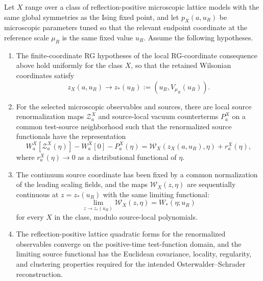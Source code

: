 \begin{hypothesis}
\label{hyp:conditional-lattice-to-continuum-universality-data}
Let \(X\) range over a class of reflection-positive microscopic lattice
models with the same global symmetries as the Ising fixed point, and let
\(p_X(a,u_R)\) be microscopic parameters tuned so that the relevant endpoint
coordinate at the reference scale \(\mu_R\) is the same fixed value \(u_R\).
Assume the following hypotheses.
\begin{enumerate}[label=(\roman*)]
  \item The finite-coordinate RG hypotheses of
  the local RG-coordinate consequence above hold uniformly for
  the class \(X\), so that the retained Wilsonian coordinates satisfy
  \[
    z_X(a,u_R)\longrightarrow z_\ast(u_R):=(u_R,V_{\mu_R}(u_R)).
  \]
  \item For the selected microscopic observables and sources, there are local
  source renormalization maps \(\mathcal Z^X_a\) and source-local vacuum
  counterterms \(P^X_a\) on a common test-source neighborhood such that the
  renormalized source functionals have the representation
  \[
    W^X_a[\mathcal Z^X_a(\eta)]-W^X_a[0]-P^X_a(\eta)
    =
    \mathcal W_X(z_X(a,u_R),\eta)+r^X_a(\eta),
  \]
  where \(r^X_a(\eta)\to0\) as a distributional functional of \(\eta\).
  \item The continuum source coordinate has been fixed by a common
  normalization of the leading scaling fields, and the maps
  \(\mathcal W_X(z,\eta)\) are sequentially continuous at
  \(z=z_\ast(u_R)\) with the same limiting functional:
  \[
    \lim_{z\to z_\ast(u_R)}\mathcal W_X(z,\eta)=W_\ast(\eta;u_R)
  \]
  for every \(X\) in the class, modulo source-local polynomials.
  \item The reflection-positive lattice quadratic forms for the renormalized
  observables converge on the positive-time test-function domain, and the
  limiting source functional has the Euclidean covariance, locality,
  regularity, and clustering properties required for the intended
  Osterwalder--Schrader reconstruction.
\end{enumerate}
\end{hypothesis}

